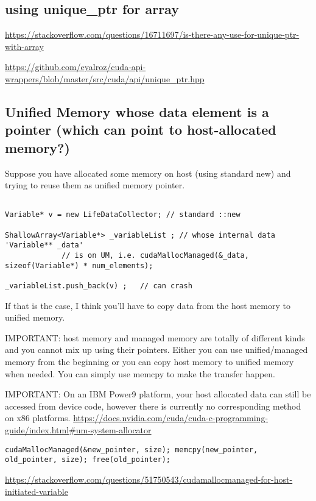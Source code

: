 \subsection{using unique\_ptr for array}

\url{https://stackoverflow.com/questions/16711697/is-there-any-use-for-unique-ptr-with-array}

\url{https://github.com/eyalroz/cuda-api-wrappers/blob/master/src/cuda/api/unique_ptr.hpp}

\subsection{Unified Memory whose data element is a pointer (which can point to host-allocated memory?)}

Suppose you have allocated some memory on host (using standard new) and trying
to reuse them as unified memory pointer.
\begin{verbatim}

Variable* v = new LifeDataCollector; // standard ::new

ShallowArray<Variable*> _variableList ; // whose internal data 'Variable** _data' 
             // is on UM, i.e. cudaMallocManaged(&_data, sizeof(Variable*) * num_elements);
             
_variableList.push_back(v) ;   // can crash 
\end{verbatim}

If that is the case, I think you’ll have to copy data from the host memory to
unified memory.
 
IMPORTANT:  host memory and managed memory are totally of different kinds and
you cannot mix up using their pointers.
Either you can use unified/managed memory from the beginning or you can copy
host memory to unified memory when needed. You can simply use memcpy to make the
transfer happen.

IMPORTANT: On an IBM Power9 platform, your host allocated data can still be
accessed from device code, however there is currently no corresponding method on
x86 platforms. \url{https://docs.nvidia.com/cuda/cuda-c-programming-guide/index.html#um-system-allocator}


\begin{verbatim}
cudaMallocManaged(&new_pointer, size); memcpy(new_pointer, old_pointer, size); free(old_pointer);

\end{verbatim}
\url{https://stackoverflow.com/questions/51750543/cudamallocmanaged-for-host-initiated-variable}


